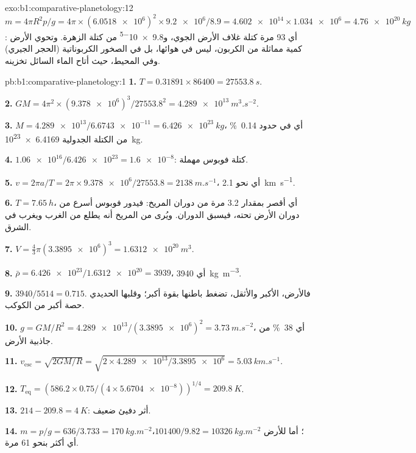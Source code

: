 \begin{solution}{exo:b1:comparative-planetology:12}
$m = 4\pi R^2p/g = 4\pi\times(\num{6.0518e6})^2\times\num{9.2e6}/8.9 =
\num{4.602e14}\times\num{1.034e6} = \qty{4.76e20}{kg}$: أي 93 مرة كتلة
غلاف الأرض الجوي، و\num{9.8e-5} من كتلة الزهرة. وتحوي الأرض كمية
مماثلة من الكربون، ليس في هوائها، بل في الصخور الكربوناتية
(الحجر الجيري) وفي المحيط، حيث أتاح الماء السائل تخزينه.
\end{solution}

\begin{solution}{pb:b1:comparative-planetology:1}
\textbf{1.} $T = 0.31891\times86400 = \qty{27553.8}{s}$.

\textbf{2.} $GM = 4\pi^2\times(\num{9.378e6})^3/\num{27553.8}^2 =
\qty{4.289e13}{m^3.s^{-2}}$.

\textbf{3.} $M = \num{4.289e13}/\num{6.6743e-11} = \qty{6.426e23}{kg}$،
أي في حدود \qty{0.14}{\percent} من الكتلة الجدولية \qty{6.4169e23}{kg}.

\textbf{4.} $\num{1.06e16}/\num{6.426e23} = \num{1.6e-8}$: كتلة فوبوس مهملة.

\textbf{5.} $v = 2\pi a/T = 2\pi\times\num{9.378e6}/27553.8 =
\qty{2138}{m.s^{-1}}$، أي نحو \qty{2.1}{km.s^{-1}}.

\textbf{6.} $T = \qty{7.65}{h}$، أي أقصر بمقدار 3.2 مرة من دوران المريخ: فيدور فوبوس أسرع من دوران الأرض تحته، فيسبق الدوران. ويُرى من المريخ أنه يطلع من الغرب ويغرب في الشرق.

\textbf{7.} $V = \tfrac43\pi(\num{3.3895e6})^3 = \qty{1.6312e20}{m^3}$.

\textbf{8.} $\bar\rho = \num{6.426e23}/\num{1.6312e20} = 3939$، أي
\qty{3940}{kg.m^{-3}}.

\textbf{9.} $3940/5514 = 0.715$. فالأرض، الأكبر والأثقل، تضغط باطنها بقوة أكبر؛ وقلبها الحديدي حصة أكبر من الكوكب.

\textbf{10.} $g = GM/R^2 = \num{4.289e13}/(\num{3.3895e6})^2 =
\qty{3.73}{m.s^{-2}}$، أي \qty{38}{\percent} من جاذبية الأرض.

\textbf{11.} $v_\mathrm{esc} = \sqrt{2GM/R} = \sqrt{2\times\num{4.289e13}/
\num{3.3895e6}} = \qty{5.03}{km.s^{-1}}$.

\textbf{12.} $T_\mathrm{eq} = (586.2\times0.75/(4\times\num{5.6704e-8}))^{1/4}
= \qty{209.8}{K}$.

\textbf{13.} $214 - 209.8 = \qty{4}{K}$: أثر دفيئ ضعيف.

\textbf{14.} $m = p/g = 636/3.733 = \qty{170}{kg.m^{-2}}$؛ أما للأرض
$101400/9.82 = \qty{10326}{kg.m^{-2}}$، أي أكثر بنحو 61 مرة.


\end{solution}
